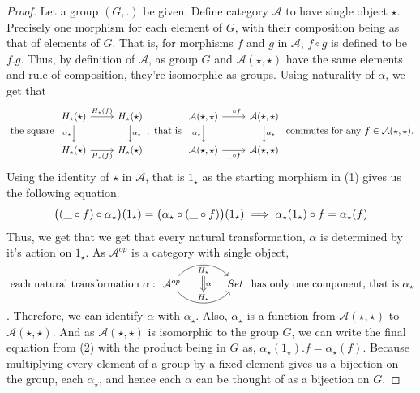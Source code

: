 \documentclass[18pt,a4paper]{article}
\theoremstyle{definition}
\begin{document}
	\begin{proof} \setcounter{equation}{0} Let a group $(G,.)$ be given.
		Define category $\mathcal{A}$ to have single object $\star$. Precisely one
		morphism for each element of $G$, with their composition being as that of elements of $G$.
		That is, for morphisms $f$ and $g$ in $\mathcal{A}$, $f \circ g$ is defined to
		be $f.g$.
		Thus, by definition of $\mathcal{A}$, as group $G$ and $\mathcal{A}(\star, \star)$
		have the same elements and rule of composition, they're isomorphic as groups.
		Using naturality of $\alpha$, we get that
		\begin{equation}
			\text{ the square }
			\begin{tikzcd}
				H_\star(\star) \arrow[swap]{d}{\alpha_\star} \arrow{r}{H_\star(f)}
			& H_\star(\star) \arrow{d}{\alpha_\star}\\
			H_\star(\star) \arrow[swap]{r}{H_\star(f)}
			& H_\star(\star)
			\end{tikzcd}
			, \text{ that is }
			\begin{tikzcd}
				\mathcal{A} (\star,\star) \arrow[swap]{d}{\alpha_\star} \arrow{r}{\string _ \circ f}
			& \mathcal{A} (\star,\star) \arrow{d}{\alpha_\star}\\
			\mathcal{A} (\star,\star) \arrow[swap]{r}{ \string _ \circ f}
			& \mathcal{A} (\star,\star)
			\end{tikzcd}
			\text{ commutes for any } f \in \mathcal{A}(\star,\star).
		\end{equation}
		Using the identity of $\star$ in $\mathcal{A}$, that is $1_\star$ as the starting morphism
		in (1) gives us the following equation.
		\begin{equation}
			\big( (\string _ \circ f) \circ \alpha_\star \big)(1_\star) =
			\big(  \alpha_\star \circ (\string _ \circ f)\big)(1_\star)
			\implies \alpha_\star(1_\star) \circ f=\alpha_\star(f)
		\end{equation}
		Thus, we get that we get that every natural transformation,
		$\alpha$ is determined by it's action on $1_\star$. As $\mathcal{A} ^{op}$ is a category with single object,
		$ \text{ each natural transformation } \alpha:
		\begin{tikzcd}[row sep=small, column sep=large]
			\mathcal{A} ^{op} \arrow[r,bend left=50, "H_\star"{name=U, below}]
			\arrow[r, bend right = 50, "H_\star"{name=D, above}]
& Set
\arrow[Rightarrow, from=U , to=D, "\alpha"]
		\end{tikzcd} \text{ has only one component, that is } \alpha_\star$. Therefore, we can
		identify $\alpha$ with $\alpha_\star$. Also, $\alpha_\star$ is a function
		from $\mathcal{A} (\star,\star)$ to $\mathcal{A} (\star,\star)$.
		And as $\mathcal{A} (\star, \star)$ is isomorphic to the group $G$, we can write
		the final equation from (2) with the product being in $G$
		as, $\alpha_\star(1_\star).f=\alpha_\star(f)$. Because
		multiplying every element of a group by a fixed element gives us a bijection on the
		group, each $\alpha_\star$, and hence each $\alpha$ can be thought of as a bijection on
		$G$.


\end{proof}
\end{document}
